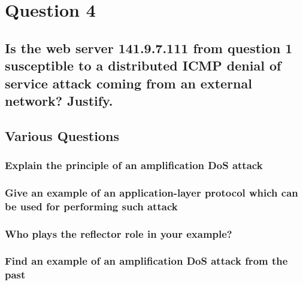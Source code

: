 \documentclass{report}
\begin{document}
	\section{Question 4}
	\startsection
		\renewcommand{\thesubsection}{\thesection.\Alph{subsection}}
		\subsection{Is the web server 141.9.7.111 from question 1 susceptible to a distributed ICMP denial of service attack coming from an external network? Justify.}
		\startsubsection
		\closesection
		\subsection{Various Questions}
		\startsubsection
			\subsubsection{Explain the principle of an amplification DoS attack}
			\startsubsection
			\closesection
			\subsubsection{Give an example of an application-layer protocol which can be used for performing such attack}
			\startsubsection
			\closesection
			\subsubsection{Who plays the reflector role in your example?}
			\startsubsection
			\closesection
			\subsubsection{Find an example of an amplification DoS attack from the past}
			\startsubsection
			\closesection
		\closesection
	\closesection
\end{document}
